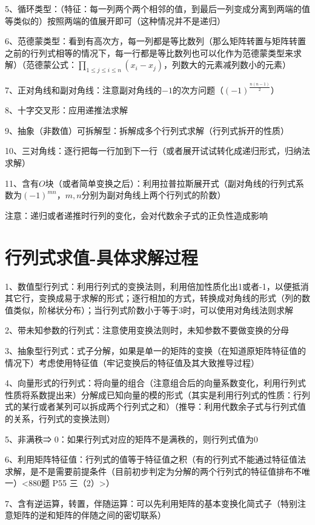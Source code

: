 5、循环类型：（特征：每一列两个两个相邻的值，到最后一列变成分离到两端的值等类似的）按照两端的值展开即可（这种情况并不是递归）

6、范德蒙类型：看到有高次方，每一列都是等比数列（那么矩阵转置与矩阵转置之前的行列式相等的情况下，每一行都是等比数列也可以化作为范德蒙类型来求解）（范德蒙公式：$\prod_{1\le j \le i \le n}(x_i-x_j)$，列数大的元素减列数小的元素）

7、正对角线和副对角线：注意副对角线的$-1$的次方问题（$(-1)^{\frac {n(n-1)}{2}}$）

8、十字交叉形：应用递推法求解

9、抽象（非数值）可拆解型：拆解成多个行列式求解（行列式拆开的性质）

10、三对角线：逐行把每一行加到下一行（或者展开试试转化成递归形式，归纳法求解）

11、含有$O$块（或者简单变换之后）：利用拉普拉斯展开式（副对角线的行列式系数为$(-1)^{mn}$，$m,n$分别为副对角线上两个行列式的阶数）

注意：递归或者递推时行列的变化，会对代数余子式的正负性造成影响

\section{行列式求值-具体求解过程}

1、数值型行列式：利用行列式的变换法则，利用倍加性质化出1或者-1，以便抵消其它行，变换成易于求解的形式；逐行相加的方式，转换成对角线的形式（列的数值类似，阶梯状分布）；当行列式阶数小于等于3时，可以使用对角线法则求解

2、带未知参数的行列式：注意使用变换法则时，未知参数不要做变换的分母

3、抽象型行列式：式子分解，如果是单一的矩阵的变换（在知道原矩阵特征值的情况下）考虑使用特征值（牢记变换后的特征值及其大致推导过程）

4、向量形式的行列式：将向量的组合（注意组合后的向量系数变化，利用行列式性质将系数提出来）分解成已知向量的模的形式（其实是利用行列式的性质：行列式的某行或者某列可以拆成两个行列式之和）（推导：利用代数余子式与行列式值的关系，行列式的变换法则）

5、非满秩⇒ 0：如果行列式对应的矩阵不是满秩的，则行列式值为0

6、利用矩阵特征值：行列式的值等于特征值之积（有的行列式不能通过特征值法求解，是不是需要前提条件（目前初步判定为分解的两个行列式的特征值排布不唯一）<880题 P55 三（2）>）

7、含有逆运算，转置，伴随运算：可以先利用矩阵的基本变换化简式子（特别注意矩阵的逆和矩阵的伴随之间的密切联系）

